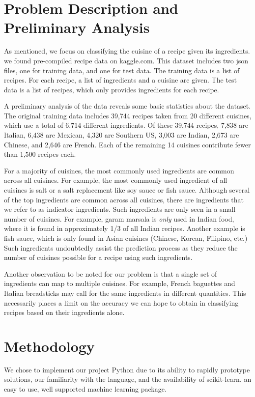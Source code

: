 \documentclass[11pt]{article}
\begin{document}
\section{Problem Description and Preliminary Analysis}
As mentioned, we focus on classifying the cuisine of a recipe given
its ingredients.  we found pre-compiled recipe data on kaggle.com.
This dataset includes two json files, one for training data, and one
for test data.  The training data is a list of recipes.  For each
recipe, a list of ingredients and a cuisine are given.  The test data
is a list of recipes, which only provides ingredients for each
recipe. 

A preliminary analysis of the data reveals some basic statistics about
the dataset.  The original training data includes 39,744 recipes taken
from 20 different cuisines, which use a total of 6,714 different
ingredients.  Of these 39,744 recipes, 7,838 are Italian, 6,438 are
Mexican, 4,320 are Southern US, 3,003 are Indian, 2,673 are Chinese,
and 2,646 are French.  Each of the remaining 14 cuisines contribute
fewer than 1,500 recipes each.

For a majority of cuisines, the most commonly used ingredients are
common across all cuisines.  For example, the most commonly used
ingredient of all cuisines is salt or a salt replacement like soy
sauce or fish sauce.  Although several of the top ingredients are
common across all cuisines, there are ingredients that we refer to as
indicator ingredients.  Such ingredients are only seen in a small
number of cuisines.  For example, garam marsala is \emph{only} used in
Indian food, where it is found in approximately 1/3 of all Indian
recipes.  Another example is fish sauce, which is only found in Asian
cuisines (Chinese, Korean, Filipino, etc.) Such ingredients
undoubtedly assist the prediction process as they reduce 
the number of cuisines possible for a recipe using such ingredients.  

Another observation to be noted for our problem is that a single set of
ingredients can map to multiple cuisines.  For example, French
baguettes and Italian breadsticks may call for the same ingredients in
different quantities.  This necessarily places a limit on the accuracy
we can hope to obtain in classifying recipes based on their
ingredients alone.


\section{Methodology}
We chose to implement our project Python due to its ability to rapidly
prototype solutions, our familiarity with the language, and the
availability of scikit-learn, an easy to use, well supported machine
learning package.  
\end{document}
